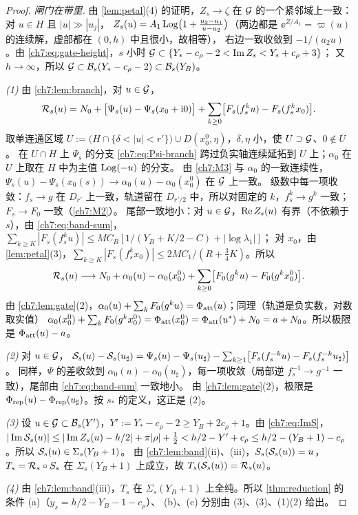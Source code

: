 \begin{proof}
\emph{闸门在带里.} 由 \cref{lem:petal}(4) 的证明，$Z_s\to\zeta$ 在 $\mathcal G$ 的一个紧邻域上一致：对 $u\in H$ 且 $|u|\gg|u_j|$，
$Z_s(u)=A_1\operatorname{Log}\bigl(1+\frac{u_2-u_1}{u-u_2}\bigr)$（两边都是 $\ee^{Z/A_1}=\varpi(u)$ 的连续解，虚部都在 $(0,h)$ 中且很小，故相等），
右边一致收敛到 $-1/(a_2u)$。由 \eqref{ch7:eq:gate-height}，$s$ 小时 $\mathcal G\subset\{Y_*-c_\rho-2<\operatorname{Im} Z_s<Y_*+c_\rho+3\}$；
又 $h\to\infty$，所以 $\mathcal G\subset\mathcal B_s(Y_*-c_\rho-2)\subset\mathcal B_s(Y_B)$。

\emph{(1)} 由 \cref{ch7:lem:branch}，对 $u\in\mathcal G$，
\[
 \mathcal R_s(u)=N_0+\bigl[\Psi_s(u)-\Psi_s(x_0+\mathrm{i}0)\bigr]+\sum_{k\ge0}\bigl[F_s(f_s^ku)-F_s(f_s^kx_0)\bigr].
\]
取单连通区域 $U:=\bigl(H\cap\{\delta<|u|<r'\}\bigr)\cup D(x_0^0,\eta)$，$\delta,\eta$ 小，使 $U\supset\mathcal G$、$0\notin\overline U$。
在 $U\cap H$ 上 $\Psi_s$ 的分支 \eqref{ch7:eq:Psi-branch} 跨过负实轴连续延拓到 $U$ 上；$\alpha_0$ 在 $U$ 上取在 $H$ 中为主值 $\operatorname{Log}(-u)$ 的分支。
由 \ref{ch7:M3} 与 $\alpha_0$ 的一致连续性，$\Psi_s(u)-\Psi_s(x_0(s))\to\alpha_0(u)-\alpha_0(x_0^0)$ 在 $\mathcal G$ 上一致。
级数中每一项收敛：$f_s\to g$ 在 $D_{r'}$ 上一致，轨道留在 $D_{r'/2}$ 中，所以对固定的 $k$，$f_s^k\to g^k$ 一致；$F_s\to F_0$ 一致（\ref{ch7:M2}）。
尾部一致地小：对 $u\in\mathcal G$，$\operatorname{Re} Z_s(u)$ 有界（不依赖于 $s$），由 \eqref{ch7:eq:band-sum}，$\sum_{k\ge K}|F_s(f_s^ku)|\le MC_B[1/(Y_B+K/2-C)+|\log\lambda_1|]$；
对 $x_0$，由 \cref{lem:petal}(3)，$\sum_{k\ge K}|F_s(f_s^kx_0)|\le2MC_1/(R+\frac34K)$。所以
\[
 \mathcal R_s(u)\longrightarrow N_0+\alpha_0(u)-\alpha_0(x_0^0)+\sum_{k\ge0}\bigl[F_0(g^ku)-F_0(g^kx_0^0)\bigr].
\]
由 \cref{ch7:lem:gate}(2)，$\alpha_0(u)+\sum_kF_0(g^ku)=\Phi_{\mathrm{att}}(u)$；同理（轨道是负实数，对数取实值）
$\alpha_0(x_0^0)+\sum_kF_0(g^kx_0^0)=\Phi_{\mathrm{att}}(x_0^0)=\Phi_{\mathrm{att}}(u^{*})+N_0=a+N_0$。所以极限是 $\Phi_{\mathrm{att}}(u)-a$。

\emph{(2)} 对 $u\in\mathcal G$，
$\mathcal S_s(u)-\mathcal S_s(u_\sharp)=\Psi_s(u)-\Psi_s(u_\sharp)-\sum_{k\ge1}\bigl[F_s(f_s^{-k}u)-F_s(f_s^{-k}u_\sharp)\bigr]$。
同样，$\Psi$ 的差收敛到 $\alpha_0(u)-\alpha_0(u_\sharp)$，每一项收敛（局部逆 $f_s^{-1}\to g^{-1}$ 一致），尾部由 \eqref{ch7:eq:band-sum} 一致地小。
由 \cref{ch7:lem:gate}(2)，极限是 $\Phi_{\mathrm{rep}}(u)-\Phi_{\mathrm{rep}}(u_\sharp)$。按 $s_*$ 的定义，这正是 (2)。

\emph{(3)} 设 $u\in\mathcal G\subset\mathcal B_s(Y')$，$Y':=Y_*-c_\rho-2\ge Y_B+2c_\rho+1$。由 \eqref{ch7:eq:ImS}，
$|\operatorname{Im}\mathcal S_s(u)|\le|\operatorname{Im} Z_s(u)-h/2|+\pi|\rho|+\frac12<h/2-Y'+c_\rho\le h/2-(Y_B+1)-c_\rho$。所以 $\mathcal S_s(u)\in\Sigma_s(Y_B+1)$。
由 \cref{ch7:lem:band}(ii)、(iii)，$S_s(\mathcal S_s(u))=u$，$T_s=\mathcal R_s\circ S_s$ 在 $\Sigma_s(Y_B+1)$ 上成立，故 $T_s(\mathcal S_s(u))=\mathcal R_s(u)$。

\emph{(4)} 由 \cref{ch7:lem:band}(iii)，$T_s$ 在 $\Sigma_s(Y_B+1)$ 上全纯。所以 \cref{thm:reduction} 的条件 (a)（$y_s=h/2-Y_B-1-c_\rho$）、
(b)、(c) 分别由 (3)、(3)、(1)(2) 给出。
\end{proof}

